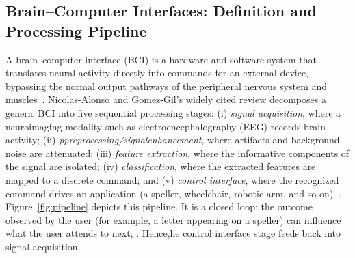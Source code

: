 \documentclass[11pt]{article}
\begin{document}
\subsection{Brain--Computer Interfaces: Definition and Processing Pipeline}

A brain--computer interface (BCI) is a hardware and software system that translates neural activity directly into commands for an external device, bypassing the normal output pathways of the peripheral nervous system and muscles~\cite{nicolasalonso2012bci}. Nicolas-Alonso and Gomez-Gil's widely cited review decomposes a generic BCI into five sequential processing stages: (i) \textit{signal acquisition}, where a neuroimaging modality such as electroencephalography (EEG) records brain activity; (ii) \textit{ppreprocessing/signalenhancement}, where artifacts and background noise are attenuated; (iii) \textit{feature extraction}, where the informative components of the signal are isolated; (iv) \textit{classification}, where the extracted features are mapped to a discrete command; and (v) \textit{control interface}, where the recognized command drives an application (a speller, wheelchair, robotic arm, and so on)~\cite{nicolasalonso2012bci}. Figure~\ref{fig:pipeline} depicts this pipeline. It is a closed loop: the outcome observed by the user (for example, a letter appearing on a speller) can influence what the user attends to next, . Hence,he control interface stage feeds back into signal acquisition.
\end{document}
